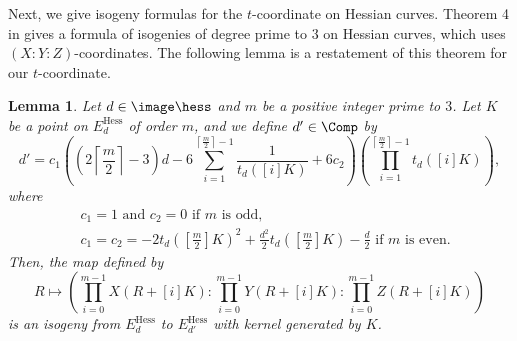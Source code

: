 \documentclass{amsart}
\newtheorem{lemma}[theorem]{Lemma}
\theoremstyle{definition}
\theoremstyle{remark}
\numberwithin{equation}{section}
\begin{document}
Next,
we give isogeny formulas for the $t$-coordinate on Hessian curves.
Theorem 4 in \cite{BDFM2021} gives a formula of isogenies of degree
prime to $3$ on Hessian curves,
which uses $(X:Y:Z)$-coordinates.
The following lemma is a restatement of this theorem for
our $t$-coordinate.
\begin{lemma}\label{lem:isogeny_formula_Hess}
    Let $d \in \image \hess$ and $m$ be a positive integer
    prime to $3$.
    Let $K$ be a point on $E_d^\mathrm{Hess}$ of order $m$,
    and we define $d' \in \Comp$ by
    \begin{equation*}
        d' = c_1 \left(
                \left(2\left\lceil\frac{m}{2}\right\rceil - 3\right)d
                - 6\sum_{i=1}^{\left\lceil\frac{m}{2}\right\rceil - 1}
                    \frac{1}{t_d([i]K)}
                    + 6c_2
            \right)
            \left(
                \prod_{i=1}^{\left\lceil\frac{m}{2}\right\rceil - 1}
                t_d([i]K)
            \right),
    \end{equation*}
    where
    \begin{align*}
    &c_1 = 1 \text{ and } c_2 = 0 \text{ if } m \text{ is odd},\\
    &c_1 = c_2 = -2t_d\left(\left[\frac{m}{2}\right]K\right)^2 + \frac{d^2}{2} t_d\left(\left[\frac{m}{2}\right]K\right) - \frac{d}{2}
    \text{ if } m \text{ is even}.
    \end{align*}
    Then, the map defined by
    \begin{equation*}
        R \mapsto
        \left(
            \prod_{i=0}^{m-1}X(R + [i]K) :
            \prod_{i=0}^{m-1}Y(R + [i]K) :
            \prod_{i=0}^{m-1}Z(R + [i]K)
        \right)
    \end{equation*}
    is an isogeny from $E_d^\mathrm{Hess}$ to $E_{d'}^\mathrm{Hess}$
    with kernel generated by $K$.
\end{lemma}
\end{document}
